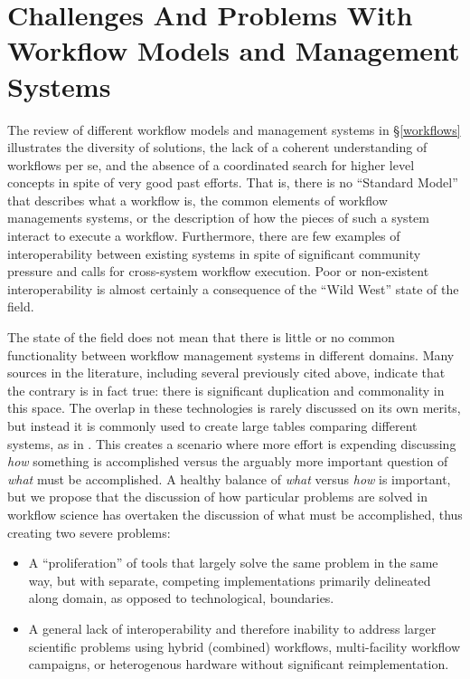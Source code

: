 \section{Challenges And Problems With Workflow Models and Management Systems}\label{commonFunc}

The review of different workflow models and management systems in
\S\ref{workflows} illustrates the diversity of solutions, the lack of a coherent
understanding of workflows per se, and the absence of a coordinated search for
higher level concepts in spite of very good past efforts. That is, there is no
``Standard Model'' that describes what a workflow is, the common elements of
workflow managements systems, or the description of how the pieces of such a
system interact to execute a workflow. Furthermore, there are few examples of
interoperability between existing systems in spite of significant community
pressure and calls for cross-system workflow execution. Poor or non-existent
interoperability is almost certainly a consequence of the ``Wild West'' state of
the field.

The state of the field does not mean that there is little or no common
functionality between workflow management systems in different domains. Many
sources in the literature, including several previously cited above, indicate
that the contrary is in fact true: there is significant duplication and
commonality in this space. The overlap in these technologies is rarely discussed
on its own merits, but instead it is commonly used to create large tables
comparing different systems, as in
\cite{ferreira_da_silva_characterization_nodate}. This creates a scenario where
more effort is expending discussing \textit{how} something is accomplished
versus the arguably more important question of \textit{what} must be
accomplished. A healthy balance of \textit{what} versus \textit{how} is
important, but we propose that the discussion of how particular problems are
solved in workflow science has overtaken the discussion of what must be
accomplished, thus creating two severe problems: \begin{itemize} \item A
``proliferation'' of tools that largely solve the same problem in the same way,
but with separate, competing implementations primarily delineated along domain,
as opposed to technological, boundaries.  \item A general lack of
interoperability and therefore inability to address larger scientific problems
using hybrid (combined) workflows, multi-facility workflow campaigns, or
heterogenous hardware without significant reimplementation.  \end{itemize}

